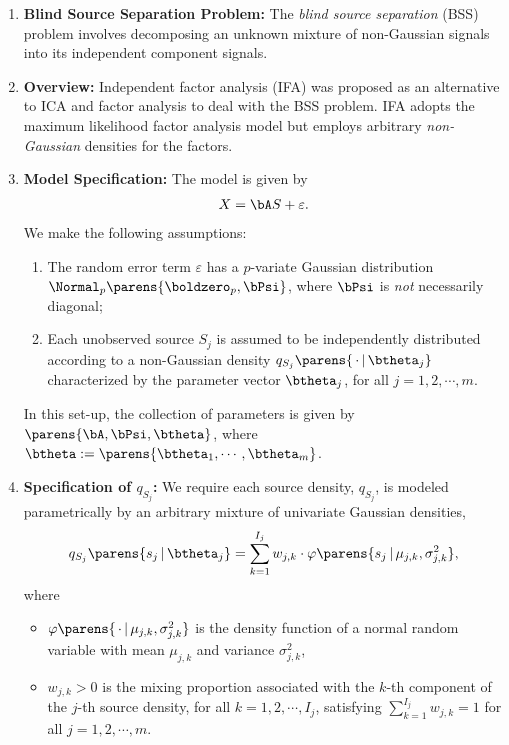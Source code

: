 \documentclass[12pt]{article}
\begin{document}
\begin{enumerate}[label=\textbf{\arabic*.}]

	\item \textbf{Blind Source Separation Problem:} The \textit{blind source separation} (BSS) problem involves decomposing an unknown mixture of non-Gaussian signals into its independent component signals. 
	
	\item \textbf{Overview:} Independent factor analysis (IFA) was proposed as an alternative to ICA and factor analysis to deal with the BSS problem. IFA adopts the maximum likelihood factor analysis model but employs arbitrary \emph{non-Gaussian} densities for the factors. 	
	
	\item \textbf{Model Specification:} The model is given by 
	\begin{align*}
		X = \bA S + \varepsilon. 
	\end{align*}
	We make the following assumptions: 
	\begin{enumerate}
		\item The random error term $\varepsilon$ has a $p$-variate Gaussian distribution $\Normal_p \parens{\boldzero_p, \bPsi}$, where $\bPsi$ is \emph{not} necessarily diagonal; 
		\item Each unobserved source $S_j$ is assumed to be independently distributed according to a non-Gaussian density $q_{S_j} \parens{\,\cdot\, \vert\, \btheta_j}$ characterized by the parameter vector $\btheta_j$, for all $j = 1, 2, \cdots, m$. 
	\end{enumerate}
	In this set-up, the collection of parameters is given by $\parens{\bA, \bPsi, \btheta}$, where $\btheta := \parens{\btheta_1, \cdots, \btheta_m}$. 
	
	\item \textbf{Specification of $q_{S_j}$:} We require each source density, $q_{S_j}$, is modeled parametrically by an arbitrary mixture of univariate Gaussian densities, 
	\begin{align*}
		q_{S_j} \parens{s_j \,\vert\, \btheta_j} = \sum_{k=1}^{I_j} w_{j, k} \cdot \varphi \parens{s_j \,\vert\, \mu_{j, k}, \sigma_{j, k}^2}, 
	\end{align*}
	where 
	\begin{itemize}
		\item $\varphi \parens{\,\cdot\, \vert\, \mu_{j, k}, \sigma_{j, k}^2 }$ is the density function of a normal random variable with mean $\mu_{j,k}$ and variance $\sigma_{j,k}^2$, 
		\item $w_{j, k} > 0$ is the mixing proportion associated with the $k$-th component of the $j$-th source density, for all $k = 1, 2, \cdots, I_j$, satisfying $\sum_{k=1}^{I_j} w_{j, k} = 1$ for all $j = 1, 2, \cdots, m$. 
	\end{itemize}
	

\end{enumerate}
\end{document}
